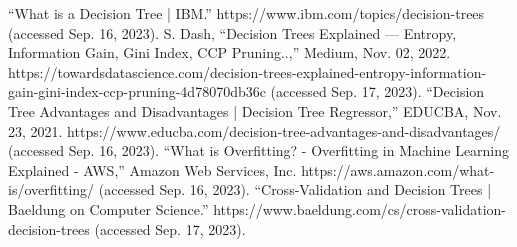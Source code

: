 \documentclass[journal]{IEEEtran}
\begin{document}
\begin{thebibliography}{00}
“What is a Decision Tree | IBM.” https://www.ibm.com/topics/decision-trees (accessed Sep. 16, 2023).
S. Dash, “Decision Trees Explained — Entropy, Information Gain, Gini Index, CCP Pruning..,” Medium, Nov. 02, 2022. https://towardsdatascience.com/decision-trees-explained-entropy-information-gain-gini-index-ccp-pruning-4d78070db36c (accessed Sep. 17, 2023).
“Decision Tree Advantages and Disadvantages | Decision Tree Regressor,” EDUCBA, Nov. 23, 2021. https://www.educba.com/decision-tree-advantages-and-disadvantages/ (accessed Sep. 16, 2023).
 “What is Overfitting? - Overfitting in Machine Learning Explained - AWS,” Amazon Web Services, Inc. https://aws.amazon.com/what-is/overfitting/ (accessed Sep. 16, 2023).
 “Cross-Validation and Decision Trees | Baeldung on Computer Science.” https://www.baeldung.com/cs/cross-validation-decision-trees (accessed Sep. 17, 2023).

\end{thebibliography}
\end{document}

